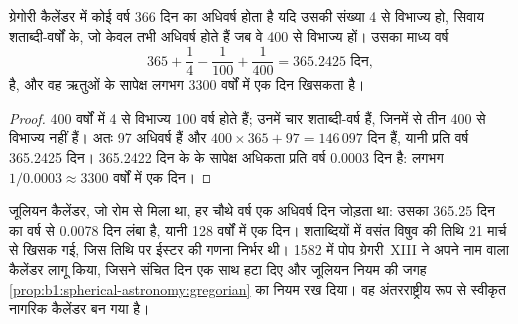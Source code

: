 \begin{proposition}[ग्रेगोरी वर्ष]\label{prop:b1:spherical-astronomy:gregorian}
ग्रेगोरी कैलेंडर में कोई वर्ष 366 दिन का अधिवर्ष होता है यदि उसकी संख्या 4 से विभाज्य हो,
सिवाय शताब्दी-वर्षों के, जो केवल तभी अधिवर्ष होते हैं जब वे 400 से विभाज्य हों। उसका माध्य
वर्ष
\[
  365 + \frac14 - \frac1{100} + \frac1{400} = \num{365.2425}\text{ दिन},
\]
है, और वह ऋतुओं के सापेक्ष लगभग 3300 वर्षों में एक दिन खिसकता है।
\end{proposition}

\begin{proof}
400 वर्षों में 4 से विभाज्य 100 वर्ष होते हैं; उनमें चार शताब्दी-वर्ष हैं, जिनमें से तीन 400 से
विभाज्य नहीं हैं। अतः 97 अधिवर्ष हैं और $400\times 365 + 97 = 146\,097$ दिन हैं, यानी प्रति वर्ष
365.2425 दिन। 365.2422 दिन के  के सापेक्ष अधिकता प्रति वर्ष 0.0003 दिन है:
लगभग $1/0.0003 \approx 3300$ वर्षों में एक दिन।
\end{proof}

\begin{history}[1582 का सुधार]
जूलियन कैलेंडर, जो रोम से मिला था, हर चौथे वर्ष एक अधिवर्ष दिन जोड़ता था: उसका 365.25 दिन
का वर्ष  से 0.0078 दिन लंबा है, यानी 128 वर्षों में एक दिन। शताब्दियों में
वसंत विषुव की तिथि 21 मार्च से खिसक गई, जिस तिथि पर ईस्टर की गणना निर्भर थी। 1582 में पोप
ग्रेगरी~XIII ने अपने नाम वाला कैलेंडर लागू किया, जिसने संचित दिन एक साथ हटा दिए और जूलियन
नियम की जगह \cref{prop:b1:spherical-astronomy:gregorian} का नियम रख दिया। वह अंतरराष्ट्रीय रूप
से स्वीकृत नागरिक कैलेंडर बन गया है।
\end{history}


